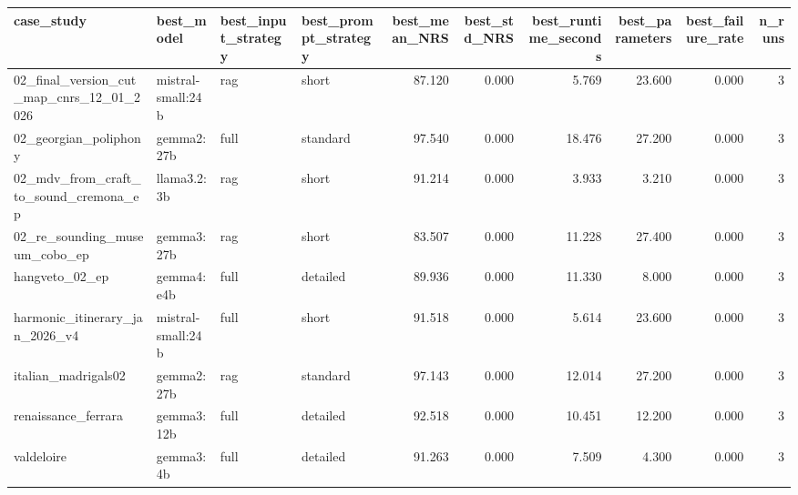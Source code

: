 \begin{tabular}{llllrrrrrr}
\toprule
case\_study & best\_model & best\_input\_strategy & best\_prompt\_strategy & best\_mean\_NRS & best\_std\_NRS & best\_runtime\_seconds & best\_parameters & best\_failure\_rate & n\_runs \\
\midrule
02\_final\_version\_cut\_map\_cnrs\_12\_01\_2026 & mistral-small:24b & rag & short & 87.120 & 0.000 & 5.769 & 23.600 & 0.000 & 3 \\
02\_georgian\_poliphony & gemma2:27b & full & standard & 97.540 & 0.000 & 18.476 & 27.200 & 0.000 & 3 \\
02\_mdv\_from\_craft\_to\_sound\_cremona\_ep & llama3.2:3b & rag & short & 91.214 & 0.000 & 3.933 & 3.210 & 0.000 & 3 \\
02\_re\_sounding\_museum\_cobo\_ep & gemma3:27b & rag & short & 83.507 & 0.000 & 11.228 & 27.400 & 0.000 & 3 \\
hangveto\_02\_ep & gemma4:e4b & full & detailed & 89.936 & 0.000 & 11.330 & 8.000 & 0.000 & 3 \\
harmonic\_itinerary\_jan\_2026\_v4 & mistral-small:24b & full & short & 91.518 & 0.000 & 5.614 & 23.600 & 0.000 & 3 \\
italian\_madrigals02 & gemma2:27b & rag & standard & 97.143 & 0.000 & 12.014 & 27.200 & 0.000 & 3 \\
renaissance\_ferrara & gemma3:12b & full & detailed & 92.518 & 0.000 & 10.451 & 12.200 & 0.000 & 3 \\
valdeloire & gemma3:4b & full & detailed & 91.263 & 0.000 & 7.509 & 4.300 & 0.000 & 3 \\
\bottomrule
\end{tabular}
